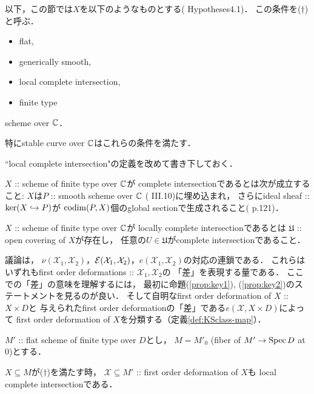 \documentclass[a4paper]{jsarticle}
\newcommand{\cvU}{\mathfrak{U}}
\newcommand{\defX}{\mathcal{X}}
\begin{document}
    以下，この節では$X$を以下のようなものとする(\cite{DefLCI} Hypotheses4.1)．
    この条件を($\dagger$)と呼ぶ．
    \begin{screen}
    \begin{itemize}
        \item flat,
        \item generically smooth,
        \item local complete intersection,
        \item finite type
    \end{itemize}
        scheme over $\mathbb{C}$．
    \end{screen}
    特にstable curve over $\mathbb{C}$はこれらの条件を満たす．

    ``local complete intersection"の定義を改めて書き下しておく．
    \begin{Def}
        $X$ :: scheme of finite type over $\mathbb{C}$が
        complete intersectionであるとは次が成立すること:
        $X$は$P$ :: smooth scheme over $\mathbb{C}$ (\cite{HarAG} III.10)に埋め込まれ，
        さらにideal sheaf :: $\ker(X \hookrightarrow P)$が
        $\operatorname{codim}(P, X)$個のglobal sectionで生成されること(\cite{HarAG} p.121)．

        $X$ :: scheme of finite type over $\mathbb{C}$が
        locally complete intersectionであるとは
        $\cvU$ :: open covering of $X$が存在し，
        任意の$U \in \cvU$がcomplete intersectionであること．
    \end{Def}
    
    議論は，
    $\nu(\defX_1, \defX_2)$，$\shE(\defX_1, \defX_2)$，$e(\defX_1, \defX_2)$の対応の連鎖である．
    これらはいずれもfirst order deformations :: $\defX_1, \defX_2$の
    「差」を表現する量である．
    ここでの「差」の意味を理解するには，
    最初に命題(\ref{prop:key1}), (\ref{prop:key2})のステートメントを見るのが良い．
    そして自明なfirst order deformation of $X$ :: $X \times D$と
    与えられたfirst order deformationの「差」である$e(\defX, X \times D)$によって
    first order deformation of $X$を分類する（定義\ref{def:KSclass-map}）．

    \begin{Thm}
        $M'$ :: flat scheme of finite type over $D$とし，
        $M=M'_{0}$ (fiber of $M' \to \operatorname{Spec} D$ at $0$)とする．

        $X \subseteq M$が($\dagger$)を満たす時，
        $\defX \subseteq M'$ :: first order deformation of $X$も
        local complete intersectionである．
    \end{Thm}
\end{document}
